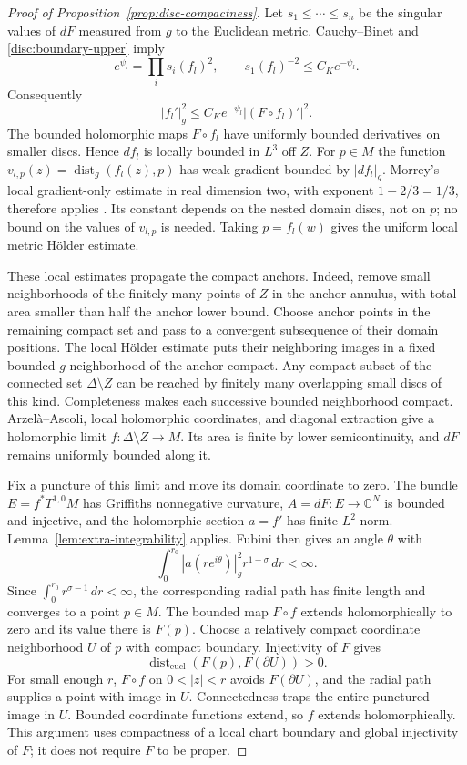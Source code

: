 \documentclass[11pt]{article}
\theoremstyle{definition}
\theoremstyle{remark}
\newcommand{\C}{\mathbb C}
\DeclareMathOperator{\dist}{dist}
\numberwithin{equation}{section}
\begin{document}
\begin{proof}[Proof of Proposition~\ref{prop:disc-compactness}]
Let $s_1\le\cdots\le s_n$ be the singular values of $dF$ measured
from $g$ to the Euclidean metric.  Cauchy--Binet and
\eqref{disc:boundary-upper} imply
\[
 e^{\psi_l}=\prod_i s_i(f_l)^2,\qquad
 s_1(f_l)^{-2}\le C_K e^{-\psi_l}.
\]
Consequently
\begin{equation}\label{disc:inverse-jacobian}
 |f_l'|_g^2\le C_K e^{-\psi_l}|(F\circ f_l)'|^2.
\end{equation}
The bounded holomorphic maps $F\circ f_l$ have uniformly bounded
derivatives on smaller discs.  Hence $df_l$ is locally bounded in
$L^3$ off $Z$.  For $p\in M$ the function
$v_{l,p}(z)=\dist_g(f_l(z),p)$ has weak gradient bounded by
$|df_l|_g$.  Morrey's local gradient-only estimate in real dimension
two, with exponent $1-2/3=1/3$, therefore applies
\cite[Section~5.6.2, Theorem~4 and the Remark on p.~283]{EvansPDE}.
Its constant depends on the nested domain discs, not on $p$;
no bound on the values of $v_{l,p}$ is needed.
Taking $p=f_l(w)$ gives the uniform local metric H\"older estimate.

These local estimates propagate the compact anchors.  Indeed, remove
small neighborhoods of the finitely many points of $Z$ in the anchor
annulus, with total area smaller than half the anchor lower bound.
Choose anchor points in the remaining compact set and pass to a
convergent subsequence of their domain positions.  The local
H\"older estimate puts their neighboring images in a fixed bounded
$g$-neighborhood of the anchor compact.  Any compact subset of the
connected set $\Delta\setminus Z$ can be reached by finitely many
overlapping small discs of this kind.  Completeness makes each
successive bounded neighborhood compact.  Arzel\`a--Ascoli, local
holomorphic coordinates, and diagonal extraction give a holomorphic
limit $f:\Delta\setminus Z\to M$.  Its area is finite by lower
semicontinuity, and $dF$ remains uniformly bounded along it.

Fix a puncture of this limit and move its domain coordinate to zero.
The bundle $E=f^*T^{1,0}M$ has Griffiths nonnegative curvature,
$A=dF:E\to\C^N$ is bounded and injective, and the holomorphic
section $a=f'$ has finite $L^2$ norm.  Lemma~\ref{lem:extra-integrability}
applies.  Fubini then gives an angle $\theta$ with
\[
 \int_0^{r_0}|a(re^{i\theta})|_g^2r^{1-\sigma}\,dr<\infty.
\]
Since $\int_0^{r_0}r^{\sigma-1}\,dr<\infty$, the corresponding
radial path has finite length and converges to a point $p\in M$.
The bounded map $F\circ f$ extends holomorphically to zero and its
value there is $F(p)$.  Choose a relatively compact coordinate
neighborhood $U$ of $p$ with compact boundary.  Injectivity of $F$
gives
\[
 \dist_{\mathrm{eucl}}(F(p),F(\partial U))>0.
\]
For small enough $r$, $F\circ f$ on $0<|z|<r$ avoids
$F(\partial U)$, and the radial path supplies a point with image in
$U$.  Connectedness traps the entire punctured image in $U$.
Bounded coordinate functions extend, so $f$ extends holomorphically.
This argument uses compactness of a local chart boundary and global
injectivity of $F$; it does not require $F$ to be proper.


\end{proof}
\end{document}

